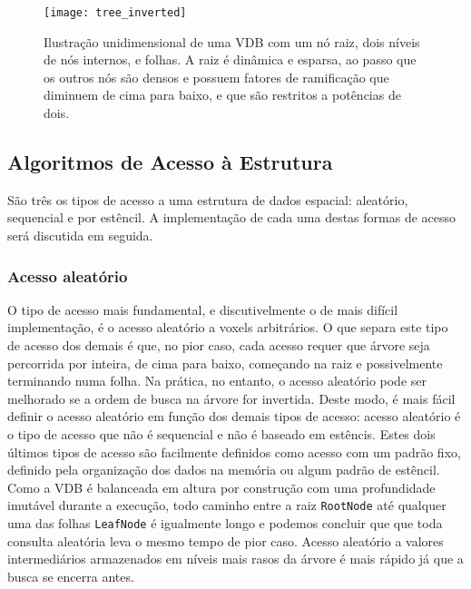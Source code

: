 \begin{figure}[!htb]
\center
\texttt{[image: tree\_inverted]}
\caption{Ilustração unidimensional de uma VDB com um nó raiz, dois níveis de nós internos, e folhas. A raiz é dinâmica e esparsa, ao passo que os outros nós são densos e possuem fatores de ramificação que diminuem de cima para baixo, e que são restritos a potências de dois.}
\label{vdbtree}
\end{figure}


\subsection{Algoritmos de Acesso à Estrutura}
São três os tipos de acesso a uma estrutura de dados espacial: aleatório, sequencial e por estêncil. A implementação de cada uma destas formas de acesso será discutida em seguida.

\subsubsection{Acesso aleatório}
O tipo de acesso mais fundamental, e discutivelmente o de mais difícil implementação, é o acesso aleatório a voxels arbitrários. O que separa este tipo de acesso dos demais é que, no pior caso, cada acesso requer que árvore seja percorrida por inteira, de cima para baixo, começando na raiz e possivelmente terminando numa folha. Na prática, no entanto, o acesso aleatório pode ser melhorado se a ordem de busca na árvore for invertida. Deste modo, é mais fácil definir o acesso aleatório em função dos demais tipos de acesso: acesso aleatório é o tipo de acesso que não é sequencial e não é baseado em estêncis. Estes dois últimos tipos de acesso são facilmente definidos como acesso com um padrão fixo, definido pela organização dos dados na memória ou algum padrão de estêncil. \\

Como a VDB é balanceada em altura por construção com uma profundidade imutável durante a execução, todo caminho entre a raiz \texttt{RootNode} até qualquer uma das folhas \texttt{LeafNode} é igualmente longo e podemos concluir que que toda consulta aleatória leva o mesmo tempo de pior caso. Acesso aleatório a valores intermediários armazenados em níveis mais rasos da árvore é mais rápido já que a busca se encerra antes. \\

